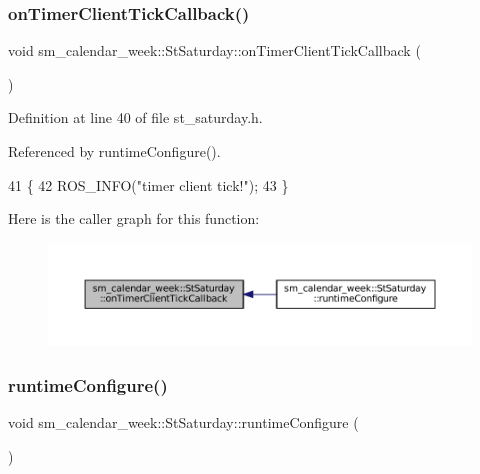 \subsubsection{\texorpdfstring{on\+Timer\+Client\+Tick\+Callback()}{onTimerClientTickCallback()}}
{\footnotesize\ttfamily void sm\+\_\+calendar\+\_\+week\+::\+St\+Saturday\+::on\+Timer\+Client\+Tick\+Callback (\begin{DoxyParamCaption}{ }\end{DoxyParamCaption})\hspace{0.3cm}{\ttfamily [inline]}}



Definition at line 40 of file st\+\_\+saturday.\+h.



Referenced by runtime\+Configure().


\begin{DoxyCode}
41     \{
42         ROS\_INFO(\textcolor{stringliteral}{"timer client tick!"});
43     \}
\end{DoxyCode}
Here is the caller graph for this function\+:
\nopagebreak
\begin{figure}[H]
\begin{center}
\leavevmode
\includegraphics[width=350pt]{structsm__calendar__week_1_1StSaturday_a6723b8838cba941546ab4e82579cdf8b_icgraph}
\end{center}
\end{figure}
\mbox{\label{structsm__calendar__week_1_1StSaturday_a3552be67b39ddaec030b7efc8909741b}} 
\subsubsection{\texorpdfstring{runtime\+Configure()}{runtimeConfigure()}}
{\footnotesize\ttfamily void sm\+\_\+calendar\+\_\+week\+::\+St\+Saturday\+::runtime\+Configure (\begin{DoxyParamCaption}{ }\end{DoxyParamCaption})\hspace{0.3cm}{\ttfamily [inline]}}



